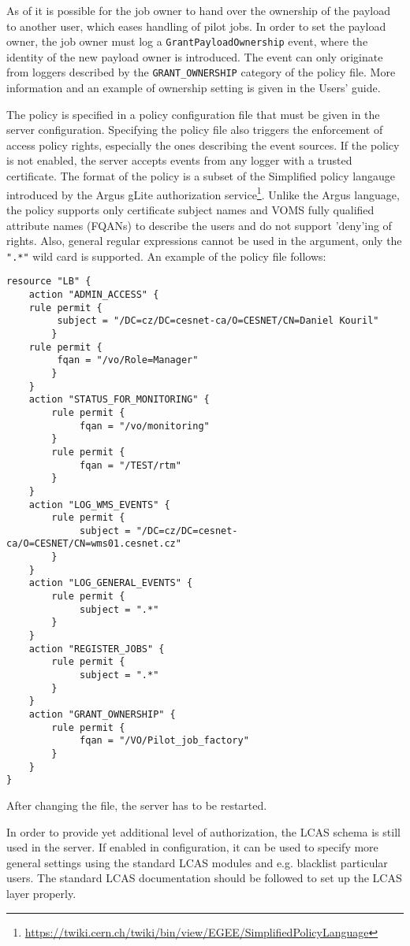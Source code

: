 As of  it is possible for the job owner to hand over the ownership
of the payload to another user, which eases handling \eg of pilot jobs. In
order to set the payload owner, the job owner must log a
\verb'GrantPayloadOwnership' event, where the identity of the new
payload owner is introduced. The event can only originate from loggers
described by the \verb'GRANT_OWNERSHIP' category of the policy file. More
information and an example of ownership setting is given in the \LB Users'
guide.

The \LB policy is specified in a policy configuration file that must be given
in the server configuration. Specifying the policy file also triggers the
enforcement of access policy rights, especially the ones describing the event
sources. If the policy is not enabled, the \LB server accepts events from any
logger with a trusted certificate. The format of the policy is a subset of the
Simplified policy langauge introduced by the Argus gLite authorization
service\footnote{\url{https://twiki.cern.ch/twiki/bin/view/EGEE/SimplifiedPolicyLanguage}}.
Unlike the Argus language, the \LB policy supports only certificate subject
names and VOMS fully qualified attribute names (FQANs) to describe the users
and do not support 'deny'ing of rights.  Also, general regular expressions
cannot be used in the argument, only the \verb'".*"' wild card is supported. An
example of the policy file follows:

\begin{lstlisting}
resource "LB" {
    action "ADMIN_ACCESS" {
	rule permit {
	     subject = "/DC=cz/DC=cesnet-ca/O=CESNET/CN=Daniel Kouril"
        }
	rule permit {
	     fqan = "/vo/Role=Manager"
        }
    }
    action "STATUS_FOR_MONITORING" {
        rule permit {
             fqan = "/vo/monitoring"
        }
        rule permit {
             fqan = "/TEST/rtm"
        }
    }
    action "LOG_WMS_EVENTS" {
        rule permit {
             subject = "/DC=cz/DC=cesnet-ca/O=CESNET/CN=wms01.cesnet.cz"
        }
    }
    action "LOG_GENERAL_EVENTS" {
        rule permit {
             subject = ".*"
        }
    }
    action "REGISTER_JOBS" {
        rule permit {
             subject = ".*"
        }
    }
    action "GRANT_OWNERSHIP" {
        rule permit {
             fqan = "/VO/Pilot_job_factory"
        }
    }
}
\end{lstlisting}

After changing the file, the server has to be restarted.

In order to provide yet additional level of authorization, the LCAS
schema\cite{lcas} is still used in the server. If enabled in configuration,
it can be used to specify more general settings using the standard LCAS
modules and e.g. blacklist particular users. The standard LCAS documentation
should be followed to set up the LCAS layer properly.

